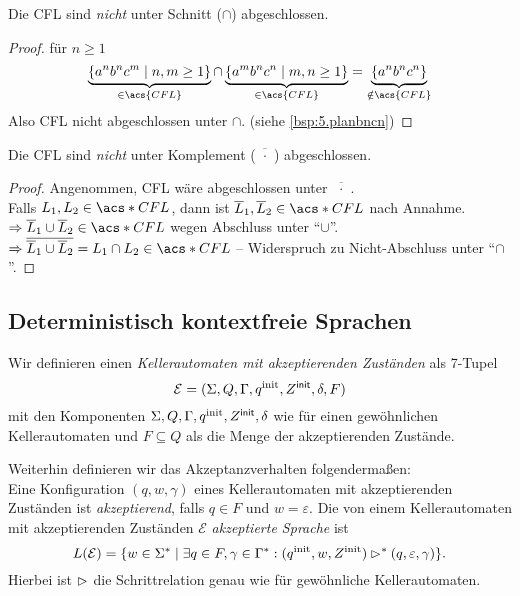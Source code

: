 \begin{Satz}
 	Die \ac{CFL} sind \emph{nicht} unter Schnitt ($\cap$) abgeschlossen.
\end{Satz}
\begin{proof}
 für $n\geq 1$
		\[ \underbrace{\{a^nb^nc^m \mid n,m\geq 1 \}}_{\in \acs{CFL}} \cap \underbrace{\{a^mb^nc^n \mid m,n\geq 1 \}}_{\in \acs{CFL}} = \underbrace{\{a^nb^nc^n\}}_{\notin \acs{CFL}} \]
		Also \ac{CFL} nicht abgeschlossen unter $\cap$.
		(siehe \autoref{bsp:5.planbncn})
\end{proof}


\begin{Satz}
 	Die \ac{CFL} sind \emph{nicht} unter Komplement ($\overline{\!\phantom{i}\cdot\!\phantom{i}}$) abgeschlossen.
\end{Satz}
\begin{proof}
Angenommen, CFL wäre abgeschlossen unter $\overline{\!\phantom{i}\cdot\!\phantom{i}}$.\\
		Falls $L_1,L_2\in \acs*{CFL}$, dann ist $\overline{L}_1,\overline{L}_2\in\acs*{CFL}$ nach Annahme.\\
		$\Rightarrow \overline{L}_1\cup \overline{L}_2\in\acs*{CFL}$ wegen Abschluss unter "`$\cup$"'.\\
		$\Rightarrow \overline{\overline{L}_1\cup \overline{L}_2} = L_1\cap L_2\in\acs*{CFL}$ -- Widerspruch zu Nicht-Abschluss unter "`$\cap$"'. \qedhere
\end{proof}


\subsection{Deterministisch kontextfreie Sprachen}

\begin{Def}
Wir definieren einen \emph{Kellerautomaten mit akzeptierenden Zuständen} als 7-Tupel
\[
	\mathcal{E} = (\Sigma,Q,\Gamma,q^\text{init},Z^\mathsf{init},\delta,F)
\]
mit den Komponenten $\Sigma,Q,\Gamma,q^\text{init},Z^\mathsf{init},\delta$ wie für einen gewöhnlichen Kellerautomaten und $F \subseteq Q$ als die Menge der akzeptierenden Zustände.

\smallskip

Weiterhin definieren wir das Akzeptanzverhalten folgendermaßen: \\
Eine Konfiguration $(q, w, \gamma)$ eines Kellerautomaten mit akzeptierenden Zuständen ist \emph{akzeptierend}, falls $q \in F$ und $w = \varepsilon$.
Die von einem Kellerautomaten mit akzeptierenden Zuständen $\mathcal{E}$ \emph{akzeptierte Sprache} ist
\[
	L(\mathcal{E}) = \{w \in \Sigma^* \mid \exists q \in F, \gamma \in \Gamma^*: (q^\text{init}, w, Z^\text{init}) \rhd^* (q, \varepsilon, \gamma)\}.
\]
Hierbei ist $\rhd$ die Schrittrelation genau wie für gewöhnliche Kellerautomaten.
\end{Def}

